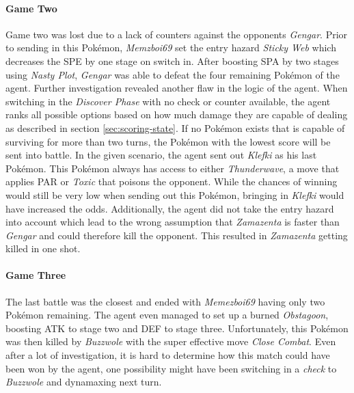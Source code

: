\paragraph{Game Two}
Game two was lost due to a lack of counters against the opponents \textit{Gengar}. Prior to sending in this Pokémon,
\textit{Memzboi69} set the entry hazard \textit{Sticky Web} which decreases the \ac{SPE} by one stage on switch in.
After boosting \ac{SPA} by two stages using \textit{Nasty Plot}, \textit{Gengar} was able to defeat the four 
remaining Pokémon of the agent. Further investigation revealed another flaw in the logic of the agent. When switching
in the \textit{Discover Phase} with no check or counter available, the agent ranks all possible options based on how 
much damage they are capable of dealing as described in section \ref{sec:scoring-state}.
If no Pokémon exists that is capable of surviving for more than two turns, the Pokémon with the lowest score will
be sent into battle. In the given scenario, the agent sent out \textit{Klefki} as his last Pokémon. This Pokémon
always has access to either \textit{Thunderwave}, a move that applies \ac{PAR} or \textit{Toxic} that poisons the
opponent. While the chances of winning would still be very low when sending out this Pokémon, bringing in \textit{Klefki}
would have increased the odds. Additionally, the agent did not take the entry hazard into account which lead to
the wrong assumption that \textit{Zamazenta} is faster than \textit{Gengar} and could therefore kill the opponent.
This resulted in \textit{Zamazenta} getting killed in one shot.

\paragraph{Game Three}
The last battle was the closest and ended with \textit{Memezboi69} having only two Pokémon remaining. The agent
even managed to set up a burned \textit{Obstagoon}, boosting \ac{ATK} to stage two and \ac{DEF} to stage three.
Unfortunately, this Pokémon was then killed by \textit{Buzzwole} with the super effective move \textit{Close Combat}.
Even after a lot of investigation, it is hard to determine how this match could have been won by the agent, one 
possibility might have been switching in a \textit{check} to \textit{Buzzwole} and dynamaxing next turn.